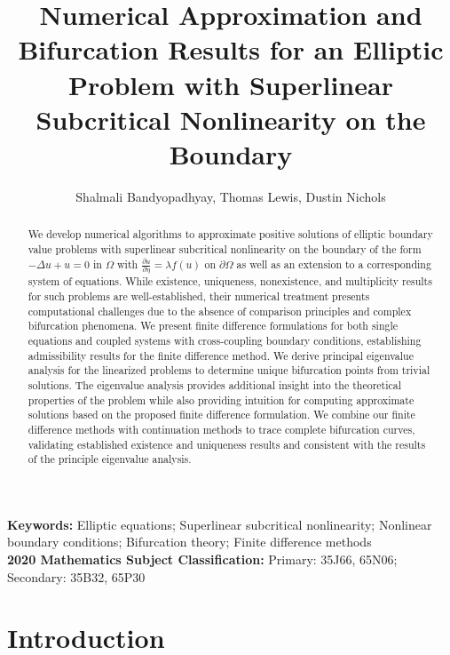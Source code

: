 \documentclass[12pt, reqno]{amsart}
\title{Numerical Approximation and Bifurcation Results for an Elliptic Problem with Superlinear Subcritical Nonlinearity on the Boundary}
\author{Shalmali Bandyopadhyay, Thomas Lewis, Dustin Nichols}
\numberwithin{equation}{section}
\begin{document}

\begin{abstract}  We develop numerical algorithms to approximate positive solutions of elliptic boundary value problems with superlinear subcritical nonlinearity on the boundary of the form $-\Delta u + u = 0$ in $\Omega$ with $\frac{\partial u}{\partial \eta} = \lambda f(u)$ on $\partial\Omega$ as well as an extension to a corresponding system of equations. While existence, uniqueness, nonexistence, and multiplicity results for such problems are well-established, their numerical treatment presents computational challenges due to the absence of comparison principles and complex bifurcation phenomena. We present finite difference formulations for both single equations and coupled systems with cross-coupling boundary conditions, establishing admissibility results for the finite difference method. We derive principal eigenvalue analysis for the linearized problems to determine unique bifurcation points from trivial solutions. The eigenvalue analysis provides additional insight into the theoretical properties of the problem while also providing intuition for computing approximate solutions based on the proposed finite difference formulation.  We combine our finite difference methods with continuation methods to trace complete bifurcation curves, validating established existence and uniqueness results and consistent with the results of the principle eigenvalue analysis.   
\end{abstract}
\maketitle 

\noindent
\textbf{Keywords:} Elliptic equations; Superlinear subcritical nonlinearity; Nonlinear boundary conditions; Bifurcation theory; Finite difference methods\\
\noindent \textbf{2020 Mathematics Subject Classification:} Primary: 35J66, 65N06; Secondary: 35B32, 65P30%
{}
\section{Introduction} 
\end{document}
